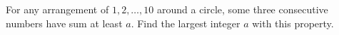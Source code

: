 For any arrangement of $1,2,\dots,10$ around a circle, some three consecutive numbers have sum at least $a$. Find the largest integer $a$ with this property.
